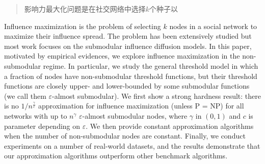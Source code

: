 
\begin{abstract}

影响力最大化问题是在社交网络中选择$k$个种子以


\end{abstract}

\begin{englishabstract}

Influence maximization is the problem of selecting $k$ nodes in a social network to maximize their influence spread.
The problem has been extensively studied but most work focuses on the submodular influence diffusion models.
In this paper, motivated by empirical evidences, we explore influence maximization in the non-submodular regime.
In particular, we study the general threshold model in which a fraction of nodes have non-submodular threshold
	functions, but their threshold functions are closely upper- and lower-bounded by some submodular
	functions (we call them $\varepsilon$-almost submodular).
We first show a strong hardness result: there is no $1/n^{\frac{\gamma}{c}}$ approximation for influence maximization (unless P = NP)
	for all networks with up to $n^{\gamma}$ $\varepsilon$-almost submodular nodes, where $\gamma$ in $(0,1)$ 
	and $c$ is parameter depending on $\varepsilon$.
We then provide constant approximation algorithms when the number of non-submodular nodes are constant.
Finally, we conduct experiments on a number of real-world datasets, and the results demonstrate that our approximation algorithms
	outperform other benchmark algorithms.


\end{englishabstract}
